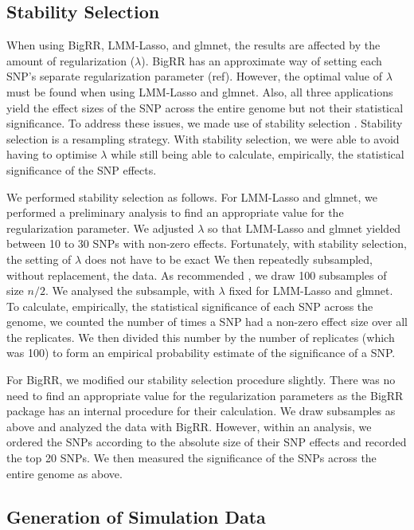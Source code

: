\documentclass{article}
\begin{document}

\subsection{Stability Selection}
When using BigRR, LMM-Lasso, and glmnet, the results are affected by the amount of regularization ($\lambda$). 
BigRR has an approximate way of setting each SNP's separate regularization parameter (ref). However, the optimal value of 
$\lambda$ must be found when using LMM-Lasso and glmnet. Also, 
all three applications yield the effect sizes of the SNP across the entire genome but not their statistical significance. To address 
these issues, we made use of stability selection \cite{meinshausen2010stability}. 
Stability selection is a resampling strategy.  With stability selection, we were able to avoid having to optimise $\lambda$ while 
still being able to calculate, empirically, the statistical significance of the SNP effects.

We performed stability selection as follows. For LMM-Lasso and glmnet, we performed a preliminary analysis to find an 
appropriate value for the regularization parameter.  We adjusted $\lambda$ so that LMM-Lasso and glmnet yielded 
between 10 to 30 SNPs with non-zero effects. Fortunately, with stability selection, the setting of $\lambda$ does not have to be exact 
 We then repeatedly subsampled, 
without replacement, the data. As recommended \cite{meinshausen2010stability}, we draw 100 subsamples of size $n/2$. We 
analysed the subsample, with $\lambda$ fixed for LMM-Lasso and glmnet.  To calculate, empirically,  the statistical significance of each 
SNP across the genome, we counted the number of times a SNP had a non-zero effect size over all the replicates. We then 
divided this number by the number of replicates (which was 100) to form an empirical probability estimate of the significance of a SNP. 


For BigRR, we modified our stability selection procedure slightly. 
There was no need to find an appropriate value for the regularization 
parameters as the BigRR package has an internal procedure for their 
calculation. We draw subsamples as above and analyzed the data with BigRR. However, within an analysis, we ordered 
the SNPs according to the absolute size of their SNP effects and recorded the top 20 SNPs. We then measured the significance 
of the SNPs across the entire genome as above. 



\subsection{Generation of Simulation Data}
\end{document}
